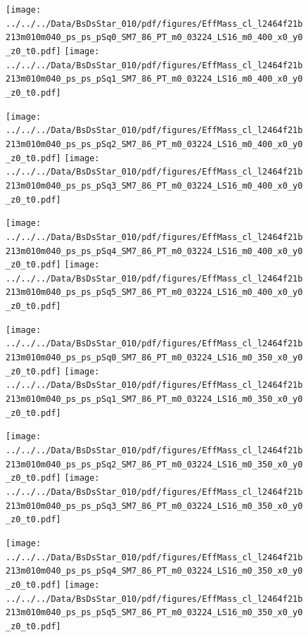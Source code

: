 \documentclass[a4paper,10pt]{article}
\begin{document}
\begin{figure}[p]
 \texttt{[image: ../../../Data/BsDsStar\_010/pdf/figures/EffMass\_cl\_l2464f21b213m010m040\_ps\_ps\_pSq0\_SM7\_86\_PT\_m0\_03224\_LS16\_m0\_400\_x0\_y0\_z0\_t0.pdf]} 
 \texttt{[image: ../../../Data/BsDsStar\_010/pdf/figures/EffMass\_cl\_l2464f21b213m010m040\_ps\_ps\_pSq1\_SM7\_86\_PT\_m0\_03224\_LS16\_m0\_400\_x0\_y0\_z0\_t0.pdf]} 
 \end{figure}
\begin{figure}[p]
 \texttt{[image: ../../../Data/BsDsStar\_010/pdf/figures/EffMass\_cl\_l2464f21b213m010m040\_ps\_ps\_pSq2\_SM7\_86\_PT\_m0\_03224\_LS16\_m0\_400\_x0\_y0\_z0\_t0.pdf]} 
 \texttt{[image: ../../../Data/BsDsStar\_010/pdf/figures/EffMass\_cl\_l2464f21b213m010m040\_ps\_ps\_pSq3\_SM7\_86\_PT\_m0\_03224\_LS16\_m0\_400\_x0\_y0\_z0\_t0.pdf]} 
 \end{figure}
\begin{figure}[p]
 \texttt{[image: ../../../Data/BsDsStar\_010/pdf/figures/EffMass\_cl\_l2464f21b213m010m040\_ps\_ps\_pSq4\_SM7\_86\_PT\_m0\_03224\_LS16\_m0\_400\_x0\_y0\_z0\_t0.pdf]} 
 \texttt{[image: ../../../Data/BsDsStar\_010/pdf/figures/EffMass\_cl\_l2464f21b213m010m040\_ps\_ps\_pSq5\_SM7\_86\_PT\_m0\_03224\_LS16\_m0\_400\_x0\_y0\_z0\_t0.pdf]} 
 \end{figure}
\clearpage
\begin{figure}[p]
 \texttt{[image: ../../../Data/BsDsStar\_010/pdf/figures/EffMass\_cl\_l2464f21b213m010m040\_ps\_ps\_pSq0\_SM7\_86\_PT\_m0\_03224\_LS16\_m0\_350\_x0\_y0\_z0\_t0.pdf]} 
 \texttt{[image: ../../../Data/BsDsStar\_010/pdf/figures/EffMass\_cl\_l2464f21b213m010m040\_ps\_ps\_pSq1\_SM7\_86\_PT\_m0\_03224\_LS16\_m0\_350\_x0\_y0\_z0\_t0.pdf]} 
 \end{figure}
\begin{figure}[p]
 \texttt{[image: ../../../Data/BsDsStar\_010/pdf/figures/EffMass\_cl\_l2464f21b213m010m040\_ps\_ps\_pSq2\_SM7\_86\_PT\_m0\_03224\_LS16\_m0\_350\_x0\_y0\_z0\_t0.pdf]} 
 \texttt{[image: ../../../Data/BsDsStar\_010/pdf/figures/EffMass\_cl\_l2464f21b213m010m040\_ps\_ps\_pSq3\_SM7\_86\_PT\_m0\_03224\_LS16\_m0\_350\_x0\_y0\_z0\_t0.pdf]} 
 \end{figure}
\begin{figure}[p]
 \texttt{[image: ../../../Data/BsDsStar\_010/pdf/figures/EffMass\_cl\_l2464f21b213m010m040\_ps\_ps\_pSq4\_SM7\_86\_PT\_m0\_03224\_LS16\_m0\_350\_x0\_y0\_z0\_t0.pdf]} 
 \texttt{[image: ../../../Data/BsDsStar\_010/pdf/figures/EffMass\_cl\_l2464f21b213m010m040\_ps\_ps\_pSq5\_SM7\_86\_PT\_m0\_03224\_LS16\_m0\_350\_x0\_y0\_z0\_t0.pdf]} 
 \end{figure}
\end{document}
